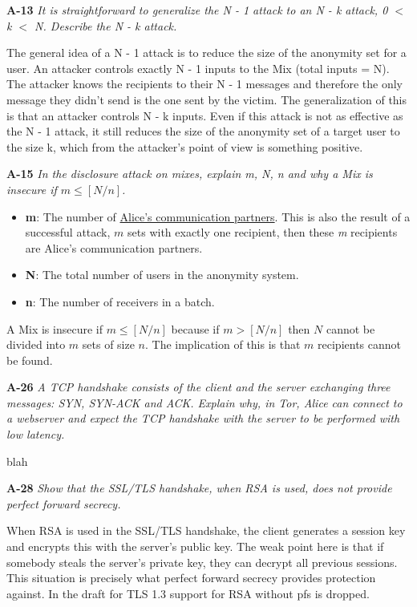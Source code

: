 \documentclass[a4paper]{article}
\newcommand{\Q}[2]{ \vspace{10pt} \textbf{#1} \textit{#2} }
\newcommand{\A}[1]{ #1 }
\begin{document}
\Q{A-13} { %
  It is straightforward to generalize the N - 1 attack to an 
  N - k attack, 0 $<$ k $<$ N. Describe the N - k attack.
}

\A{
  The general idea of a N - 1 attack is to reduce the size of
  the anonymity set for a user. An attacker controls exactly N - 1 
  inputs to the Mix (total inputs = N). The attacker knows
  the recipients to their N - 1 messages and therefore the only 
  message they didn't send is the one sent by the victim.
  The generalization of this is that an attacker controls N - k
  inputs. Even if this attack is not as effective as the N - 1
  attack, it still reduces the size of the anonymity set of a target user 
  to the size k, which from the attacker's point of view
  is something positive.  
}

\Q{A-15} {
  In the disclosure attack on mixes, 
  explain m, N, n and why a Mix is insecure if $m \leq [N / n]$.
}

\A{
  \begin{itemize}
    \item \textbf{m}: The number of \underline{Alice's communication partners}. This is also the result of a successful attack, 
    $m$  sets with exactly one recipient, then these \textit{m}
    recipients are Alice's communication partners. 
    \item \textbf{N}: The total number of users in the anonymity system.
    \item \textbf{n}: The number of receivers in a batch.
  \end{itemize}

  A Mix is insecure if $m \leq [N / n]$ because if $m > [N / n]$
  then $N$ cannot be divided into $m$ sets of size $n$. The implication of this 
  is that $m$ recipients cannot be found.
}

\Q{A-26} {
  A TCP handshake consists of the client and the server exchanging 
  three messages: SYN, SYN-ACK and ACK. 
  Explain why, in Tor, Alice can connect to a webserver and expect 
  the TCP handshake with the
  server to be performed with low latency.
}

\A{
  blah
}

\Q{A-28} {
  Show that the SSL/TLS handshake, when RSA is used, 
  does not provide perfect forward secrecy.
}

\A{
  When RSA is used in the SSL/TLS handshake, the client generates a session key
  and encrypts this with the server's public key.
  The weak point here is that if somebody steals the server's private key,
  they can decrypt all previous sessions. This situation is precisely what 
  perfect forward secrecy provides protection against. 
  In the draft for TLS 1.3 support for RSA without pfs is dropped.
}
\end{document}

